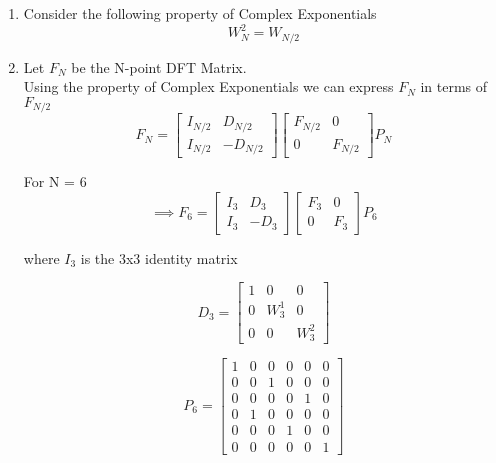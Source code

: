 \documentclass[journal,12pt,twocolumn]{IEEEtran}
\renewcommand\thesection{\arabic{section}}
\begin{document}
\begin{enumerate}[label=\thesection.\arabic*.,ref=\thesection.\theenumi]
\item Consider the following property of Complex Exponentials
\begin{equation}
    W_{N}^{2}=W_{N/2}
\end{equation}

\item
Let $F_{N}$ be the N-point DFT Matrix. \\
Using the property of Complex Exponentials we can express $F_{N}$ in terms of $F_{N/2}$
\begin{equation}
F_{N}=
\begin{bmatrix}
I_{N/2} & D_{N/2} \\
I_{N/2} & -D_{N/2}
\end{bmatrix}
\begin{bmatrix}
F_{N/2} & 0 \\
0 & F_{N/2}
\end{bmatrix}
P_{N}
\end{equation}

For N = 6
\begin{equation}
\implies F_{6}=
\begin{bmatrix}
I_{3} & D_{3} \\
I_{3} & -D_{3}
\end{bmatrix}
\begin{bmatrix}
F_{3} & 0 \\
0 & F_{3}
\end{bmatrix}
P_{6}
\end{equation}

where
$I_{3}$ is the 3x3 identity matrix

\begin{equation}
D_{3}=
\begin{bmatrix}
1 & 0 & 0 \\
0 & W^{1}_{3} & 0 \\
0 & 0 & W^{2}_{3}
\end{bmatrix}
\end{equation}

\begin{equation}
P_{6} =
\begin{bmatrix}
1 & 0 & 0 & 0 & 0 & 0\\
0 & 0 & 1 & 0 & 0 & 0\\
0 & 0 & 0 & 0 & 1 & 0\\
0 & 1 & 0 & 0 & 0 & 0\\
0 & 0 & 0 & 1 & 0 & 0\\
0 & 0 & 0 & 0 & 0 & 1
\end{bmatrix} 
\end{equation}


\end{enumerate}
\end{document}

